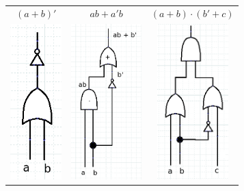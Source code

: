 \documentclass[a4paper,12pt]{book}
\begin{document}
\begin{intro}{\ }
		\begin{center}
			\begin{tabular}{c c c}
				$(a+b)'$ &
				$ ab + a'b $ &
				$(a+b) \cdot (b' + c)$
				\\
				\includegraphics[height=6cm]{images/3-5-gate1.png} &
				\includegraphics[height=6cm]{images/3-5-gate2.png} &
				\includegraphics[height=6cm]{images/3-5-gate3.png}
			\end{tabular}
		\end{center}

	\end{intro}

		\newpage
\end{document}
